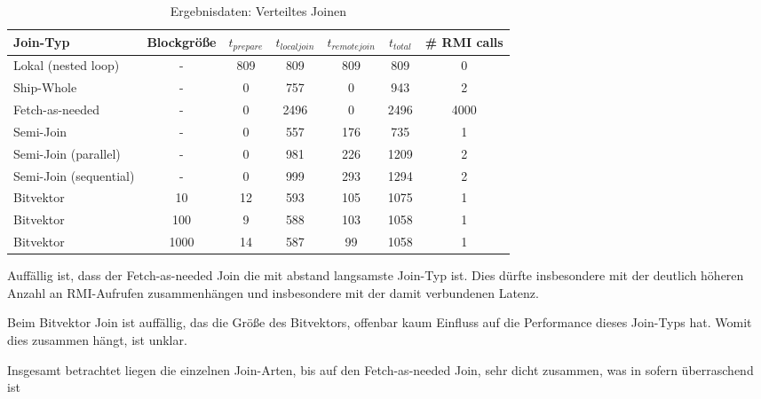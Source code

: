 \documentclass[fontsize=12pt,a4paper,headinclude=no,headings=small]{scrartcl}
\begin{document}
\begin{table}[htp]
\begin{tabularx}{\textwidth}{ |X|c|c|c|c|c|c| }
\hline
Join-Typ & Blockgröße & $t_{prepare}$ & $t_{localjoin}$ & $t_{remotejoin}$  & $t_{total}$ & \# RMI calls \\
\hline
Lokal (nested loop) & - & 809 & 809 & 809 & 809 & 0 \\
Ship-Whole & - & 0 & 757 & 0 & 943 & 2 \\
Fetch-as-needed & - & 0 & 2496 & 0 & 2496 & 4000 \\
Semi-Join & - & 0 & 557 & 176 & 735 & 1 \\
Semi-Join (parallel) & - & 0 & 981 & 226 & 1209 & 2 \\
Semi-Join (sequential) & - & 0 & 999 & 293 & 1294 & 2 \\
Bitvektor & 10 & 12 & 593 & 105 & 1075 & 1 \\
Bitvektor & 100 & 9 & 588 & 103 & 1058 & 1 \\
Bitvektor & 1000 & 14 & 587 & 99 & 1058 & 1 \\
\hline
\end{tabularx}
\caption{Ergebnisdaten: Verteiltes Joinen}
\end{table}
Auffällig ist, dass der Fetch-as-needed Join die mit abstand langsamste Join-Typ ist. Dies dürfte insbesondere mit der deutlich höheren Anzahl an RMI-Aufrufen zusammenhängen und insbesondere mit der damit verbundenen Latenz.

Beim Bitvektor Join ist auffällig, das die Größe des Bitvektors, offenbar kaum Einfluss auf die Performance dieses Join-Typs hat. Womit dies zusammen hängt, ist unklar. 

Insgesamt betrachtet liegen die einzelnen Join-Arten, bis auf den Fetch-as-needed Join, sehr dicht zusammen, was in sofern überraschend ist
\end{document}
